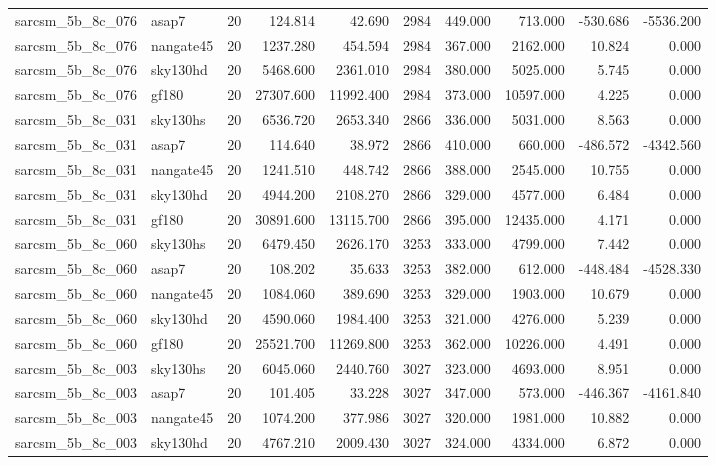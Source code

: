 \documentclass{article}
\begin{document}
\begin{longtable}{llrrrrrrrr}
sarcsm\_5b\_8c\_076 & asap7 & 20 & 124.814 & 42.690 & 2984 & 449.000 & 713.000 & -530.686 & -5536.200 \\
sarcsm\_5b\_8c\_076 & nangate45 & 20 & 1237.280 & 454.594 & 2984 & 367.000 & 2162.000 & 10.824 & 0.000 \\
sarcsm\_5b\_8c\_076 & sky130hd & 20 & 5468.600 & 2361.010 & 2984 & 380.000 & 5025.000 & 5.745 & 0.000 \\
sarcsm\_5b\_8c\_076 & gf180 & 20 & 27307.600 & 11992.400 & 2984 & 373.000 & 10597.000 & 4.225 & 0.000 \\
sarcsm\_5b\_8c\_031 & sky130hs & 20 & 6536.720 & 2653.340 & 2866 & 336.000 & 5031.000 & 8.563 & 0.000 \\
sarcsm\_5b\_8c\_031 & asap7 & 20 & 114.640 & 38.972 & 2866 & 410.000 & 660.000 & -486.572 & -4342.560 \\
sarcsm\_5b\_8c\_031 & nangate45 & 20 & 1241.510 & 448.742 & 2866 & 388.000 & 2545.000 & 10.755 & 0.000 \\
sarcsm\_5b\_8c\_031 & sky130hd & 20 & 4944.200 & 2108.270 & 2866 & 329.000 & 4577.000 & 6.484 & 0.000 \\
sarcsm\_5b\_8c\_031 & gf180 & 20 & 30891.600 & 13115.700 & 2866 & 395.000 & 12435.000 & 4.171 & 0.000 \\
sarcsm\_5b\_8c\_060 & sky130hs & 20 & 6479.450 & 2626.170 & 3253 & 333.000 & 4799.000 & 7.442 & 0.000 \\
sarcsm\_5b\_8c\_060 & asap7 & 20 & 108.202 & 35.633 & 3253 & 382.000 & 612.000 & -448.484 & -4528.330 \\
sarcsm\_5b\_8c\_060 & nangate45 & 20 & 1084.060 & 389.690 & 3253 & 329.000 & 1903.000 & 10.679 & 0.000 \\
sarcsm\_5b\_8c\_060 & sky130hd & 20 & 4590.060 & 1984.400 & 3253 & 321.000 & 4276.000 & 5.239 & 0.000 \\
sarcsm\_5b\_8c\_060 & gf180 & 20 & 25521.700 & 11269.800 & 3253 & 362.000 & 10226.000 & 4.491 & 0.000 \\
sarcsm\_5b\_8c\_003 & sky130hs & 20 & 6045.060 & 2440.760 & 3027 & 323.000 & 4693.000 & 8.951 & 0.000 \\
sarcsm\_5b\_8c\_003 & asap7 & 20 & 101.405 & 33.228 & 3027 & 347.000 & 573.000 & -446.367 & -4161.840 \\
sarcsm\_5b\_8c\_003 & nangate45 & 20 & 1074.200 & 377.986 & 3027 & 320.000 & 1981.000 & 10.882 & 0.000 \\
sarcsm\_5b\_8c\_003 & sky130hd & 20 & 4767.210 & 2009.430 & 3027 & 324.000 & 4334.000 & 6.872 & 0.000 \\

\end{longtable}
\end{document}
